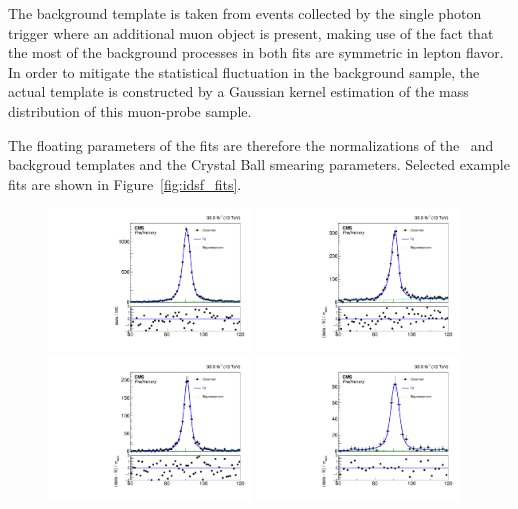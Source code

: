 The background template is taken from events collected by the single photon trigger where an
additional muon object is present, making use of the fact that the most of the background processes in both fits are symmetric in lepton flavor. 
In order to mitigate the statistical fluctuation in the background sample, the actual template is constructed by a Gaussian kernel estimation of the mass distribution of this muon-probe sample. 

The floating parameters of the fits are therefore the normalizations of the \Zee\ and backgroud templates and the Crystal Ball smearing parameters. 
Selected example fits are shown in Figure~\ref{fig:idsf_fits}.

\begin{figure}[htbp]
  \begin{center}
    \includegraphics[width=0.48\textwidth]{Calibration/Figures/idsf/fit_data_pass_pt_175_200.pdf}
    \includegraphics[width=0.48\textwidth]{Calibration/Figures/idsf/fit_data_fail_pt_175_200.pdf}
    \includegraphics[width=0.48\textwidth]{Calibration/Figures/idsf/fit_data_pass_pt_300_350.pdf}
    \includegraphics[width=0.48\textwidth]{Calibration/Figures/idsf/fit_data_fail_pt_300_350.pdf}

\end{center}
\end{figure}
